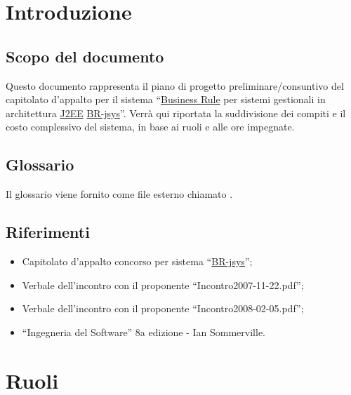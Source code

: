 \tableofcontents 


\chapter{Introduzione}
\section{Scopo del documento}
Questo documento rappresenta il piano di progetto preliminare/consuntivo del capitolato d'appalto per il sistema ``\underline{Business Rule} per sistemi gestionali in architettura \underline{J2EE} \underline{BR-jsys}''. Verr\`a qui riportata la suddivisione dei compiti e il costo complessivo del sistema, in base ai ruoli e alle ore impegnate.

\section{Glossario}
Il glossario viene fornito come file esterno chiamato \Glossario .

\section{Riferimenti}
\begin{itemize}
\item Capitolato d'appalto concorso per sistema ``\underline{BR-jsys}'';
\item Verbale dell'incontro con il proponente ``Incontro2007-11-22.pdf'';
\item Verbale dell'incontro con il proponente ``Incontro2008-02-05.pdf'';
\item ``Ingegneria del Software'' 8a edizione - Ian Sommerville.
\end{itemize}

\chapter{Ruoli}
